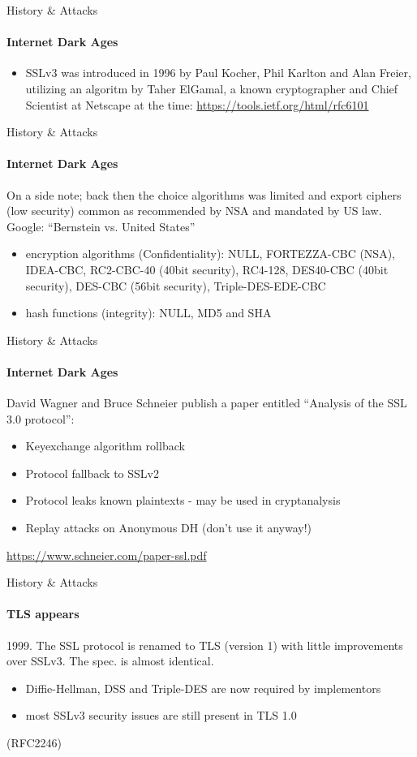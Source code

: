 \documentclass[hyperref={draft}]{beamer}
\begin{document}
\begin{frame}{History \& Attacks}
  \framesubtitle{Internet Dark Ages}
  \begin{itemize}
    \item SSLv3 was introduced in 1996 by Paul Kocher, Phil Karlton and Alan Freier, utilizing an algoritm by Taher ElGamal, a known cryptographer and Chief Scientist at Netscape at the time: \url{https://tools.ietf.org/html/rfc6101}
  \end{itemize}
\end{frame}

\begin{frame}{History \& Attacks}
  \framesubtitle{Internet Dark Ages}
  On a side note; back then the choice algorithms was limited and export ciphers (low security) common as recommended by NSA and mandated by US law. Google: ``Bernstein vs. United States''
  \begin{itemize}
    \item encryption algorithms (Confidentiality): NULL, FORTEZZA-CBC (NSA), IDEA-CBC, RC2-CBC-40 (40bit security), RC4-128, DES40-CBC (40bit security), DES-CBC (56bit security), Triple-DES-EDE-CBC
    \item hash functions (integrity): NULL, MD5 and SHA
  \end{itemize}
\end{frame}

\begin{frame}{History \& Attacks}
  \framesubtitle{Internet Dark Ages}
  David Wagner and Bruce Schneier publish a paper entitled ``Analysis of the SSL 3.0 protocol'':
  \begin{itemize}
    \item Keyexchange algorithm rollback
    \item Protocol fallback to SSLv2
    \item Protocol leaks known plaintexts - may be used in cryptanalysis 
    \item Replay attacks on Anonymous DH (don't use it anyway!)
  \end{itemize}

  \vspace{50px}

  \tiny\url{https://www.schneier.com/paper-ssl.pdf}
\end{frame}

\begin{frame}{History \& Attacks}
  \framesubtitle{TLS appears}
  1999. The SSL protocol is renamed to TLS (version 1) with little improvements over SSLv3. The spec. is almost identical.
  \begin{itemize}
    \item Diffie-Hellman, DSS and Triple-DES are now required by implementors
    \item most SSLv3 security issues are still present in TLS 1.0
  \end{itemize}
  (RFC2246)
\end{frame}
\end{document}
